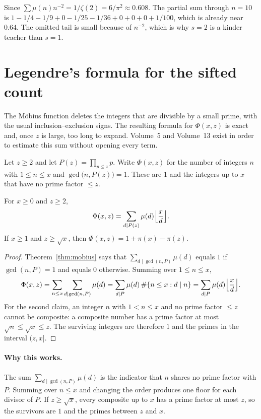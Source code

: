 \begin{examplex}[the series for $\mu$ at $s=2$]
Since $\sum\mu(n)n^{-2}=1/\zeta(2)=6/\pi^2\approx 0.608$. The partial sum through $n=10$ is $1-1/4-1/9+0-1/25-1/36+0+0+0+1/100$, which is already near $0.64$. The omitted tail is small because of $n^{-2}$, which is why $s=2$ is a kinder teacher than $s=1$.
\end{examplex}

\section{Legendre's formula for the sifted count}

The M\"obius function deletes the integers that are divisible by a small prime, with the usual inclusion--exclusion signs. The resulting formula for $\Phi(x,z)$ is exact and, once $z$ is large, too long to expand. Volume~5 and Volume~13 exist in order to estimate this sum without opening every term.

Let $z\ge2$ and let $P(z)=\prod_{p\le z}p$. Write $\Phi(x,z)$ for the number of integers $n$ with $1\le n\le x$ and $\gcd\bigl(n,P(z)\bigr)=1$. These are $1$ and the integers up to $x$ that have no prime factor $\le z$.

\begin{theorem}[Legendre]\label{thm:t1-sieve}
For $x\ge0$ and $z\ge2$,
\[
\Phi(x,z)=\sum_{d\mid P(z)}\mu(d)\Bigl\lfloor\frac xd\Bigr\rfloor.
\]
If $x\ge1$ and $z\ge\sqrt x$, then $\Phi(x,z)=1+\pi(x)-\pi(z)$.
\end{theorem}
\begin{proof}
Theorem~\ref{thm:mobius} says that $\sum_{d\mid\gcd(n,P)}\mu(d)$ equals $1$ if $\gcd(n,P)=1$ and equals $0$ otherwise. Summing over $1\le n\le x$,
\[
\Phi(x,z)=\sum_{n\le x}\sum_{d\mid\gcd(n,P)}\mu(d)
=\sum_{d\mid P}\mu(d)\,\#\{n\le x:d\mid n\}
=\sum_{d\mid P}\mu(d)\Bigl\lfloor\frac xd\Bigr\rfloor.
\]
For the second claim, an integer $n$ with $1<n\le x$ and no prime factor $\le z$ cannot be composite: a composite number has a prime factor at most $\sqrt n\le\sqrt x\le z$. The surviving integers are therefore $1$ and the primes in the interval $(z,x]$.
\end{proof}

\paragraph{Why this works.}
The sum $\sum_{d\mid\gcd(n,P)}\mu(d)$ is the indicator that $n$ shares no prime factor with $P$. Summing over $n\le x$ and changing the order produces one floor for each divisor of $P$. If $z\ge\sqrt x$, every composite up to $x$ has a prime factor at most $z$, so the survivors are $1$ and the primes between $z$ and $x$.

